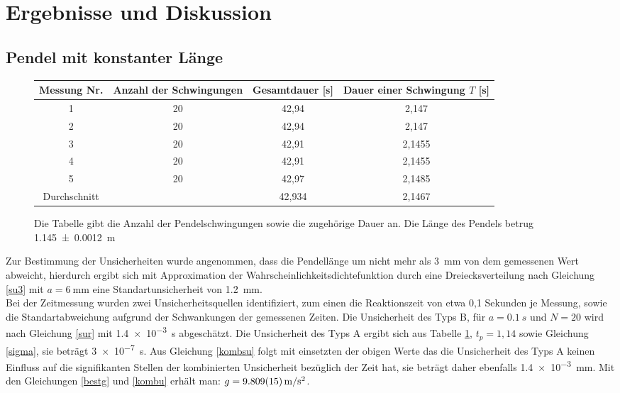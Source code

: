 \newpage

\section{Ergebnisse und Diskussion}


\subsection{Pendel mit konstanter Länge}


\begin{figure}[h]


\begin{tabular}{|c||c|c|c|}
\hline
Messung Nr. & Anzahl der Schwingungen & Gesamtdauer [s] & Dauer einer Schwingung $T$ [s] \\ \hline \hline
1&	20&	42,94&	2,147	\\ \hline
2&	20&	42,94&	2,147	\\ \hline
3&	20&	42,91&	2,1455	\\ \hline
4&	20&	42,91&	2,1455	\\	\hline
5&	20&	42,97&	2,1485	\\ \hline
Durchschnitt&&42,934&2,1467	\\ \hline


	
\end{tabular}
\caption{Die Tabelle gibt die Anzahl der Pendelschwingungen sowie die zugehörige Dauer an. Die Länge des Pendels betrug \SI{1,145+-0,0012} {\m}}
\label{lkonst}

\end{figure}

Zur Bestimmung der Unsicherheiten wurde angenommen, dass die Pendellänge um nicht mehr als \SI{3}{\mm} von dem gemessenen Wert abweicht, hierdurch ergibt sich mit Approximation der Wahrscheinlichkeitsdichtefunktion durch eine Dreiecksverteilung nach Gleichung \ref{su3} mit $a=\SI{6}{\mm}$ eine Standartunsicherheit von \SI{1,2}{mm}. \\
Bei der Zeitmessung wurden zwei Unsicherheitsquellen identifiziert, zum einen die Reaktionszeit von etwa 0,1 Sekunden je Messung, sowie die Standartabweichung aufgrund der Schwankungen der gemessenen Zeiten. Die Unsicherheit des Typs B, für  $a=\SI{0,1}{s} $ und $N=20$ wird nach Gleichung \ref{sur} mit \SI{1,4e-3}{\s} abgeschätzt. Die Unsicherheit des Typs A ergibt sich aus Tabelle \ref{lkonst}, $t_p=1,14$ sowie Gleichung \ref{sigma}, sie beträgt \SI{3e-7}{s}. Aus Gleichung \ref{kombsu} folgt mit einsetzten der obigen Werte das die Unsicherheit des Typs A keinen Einfluss  auf die signifikanten Stellen der kombinierten Unsicherheit bezüglich der Zeit hat, sie beträgt daher ebenfalls \SI{1,4e-3}{mm}.
Mit den Gleichungen \ref{bestg} und \ref{kombu} erhält man: $g=\SI{9,809+-0,015}{m/s^2}$.





